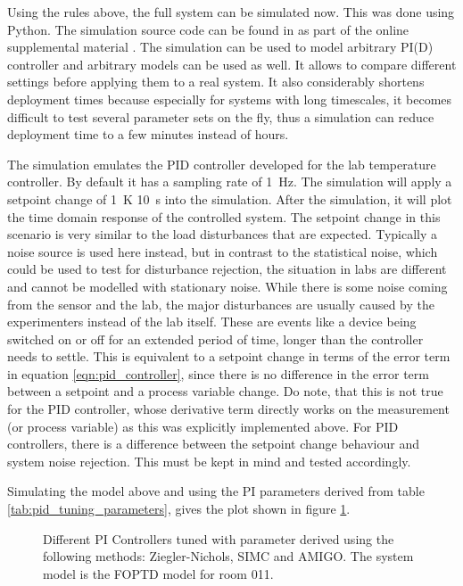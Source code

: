 Using the rules above, the full system can be simulated now. This was done using Python. The simulation source code can be found in  as part of the online supplemental material \cite{supplemental_material}. The simulation can be used to model arbitrary PI(D) controller and arbitrary models can be used as well. It allows to compare different settings before applying them to a real system. It also considerably shortens deployment times because especially for systems with long timescales, it becomes difficult to test several parameter sets on the fly, thus a simulation can reduce deployment time to a few minutes instead of hours.

The simulation emulates the PID controller developed for the lab temperature controller. By default it has a sampling rate of \qty{1}{\Hz}. The simulation  will apply a setpoint change of \qty{+1}{\K} \qty{10}{\s} into the simulation. After the simulation, it will plot the time domain response of the controlled system. The setpoint change in this scenario is very similar to the load disturbances that are expected. Typically a noise source is used here instead, but in contrast to the statistical noise, which could be used to test for disturbance rejection, the situation in labs are different and cannot be modelled with stationary noise. While there is some noise coming from the sensor and the lab, the major disturbances are usually caused by the experimenters instead of the lab itself. These are events like a device being switched on or off for an extended period of time, longer than the controller needs to settle. This is equivalent to a setpoint change in terms of the error term in equation \ref{eqn:pid_controller}, since there is no difference in the error term between a setpoint and a process variable change. Do note, that this is not true for the PID controller, whose derivative term directly works on the measurement (or process variable) as this was explicitly implemented above. For PID controllers, there is a difference between the setpoint change behaviour and system noise rejection. This must be kept in mind and tested accordingly.

Simulating the model above and using the PI parameters derived from table \ref{tab:pid_tuning_parameters}, gives the plot shown in figure \ref{fig:pid_controller_comparison}.
\begin{figure}[ht]
    \centering
    
    \caption{Different PI Controllers tuned with parameter derived using the following methods: Ziegler-Nichols, SIMC and AMIGO. The system model is the FOPTD model for room 011.}
    \label{fig:pid_controller_comparison}
\end{figure}

